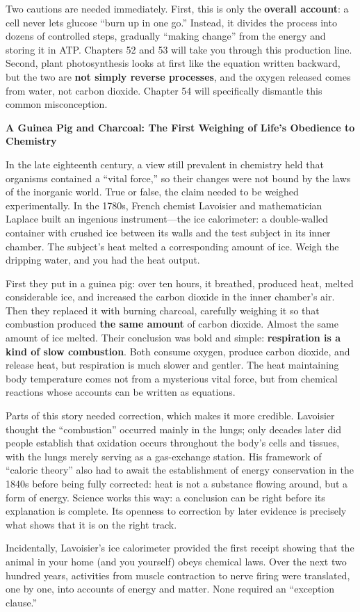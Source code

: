Two cautions are needed immediately. First, this is only the \textbf{overall account}: a cell never lets glucose ``burn up in one go.'' Instead, it divides the process into dozens of controlled steps, gradually ``making change'' from the energy and storing it in ATP. Chapters 52 and 53 will take you through this production line. Second, plant photosynthesis looks at first like the equation written backward, but the two are \textbf{not simply reverse processes}, and the oxygen released comes from water, not carbon dioxide. Chapter 54 will specifically dismantle this common misconception.

\begin{zhengju}
\textbf{A Guinea Pig and Charcoal: The First Weighing of Life's Obedience to Chemistry}

In the late eighteenth century, a view still prevalent in chemistry held that organisms contained a ``vital force,'' so their changes were not bound by the laws of the inorganic world. True or false, the claim needed to be weighed experimentally. In the 1780s, French chemist Lavoisier and mathematician Laplace built an ingenious instrument---the ice calorimeter: a double-walled container with crushed ice between its walls and the test subject in its inner chamber. The subject's heat melted a corresponding amount of ice. Weigh the dripping water, and you had the heat output.

First they put in a guinea pig: over ten hours, it breathed, produced heat, melted considerable ice, and increased the carbon dioxide in the inner chamber's air. Then they replaced it with burning charcoal, carefully weighing it so that combustion produced \textbf{the same amount} of carbon dioxide. Almost the same amount of ice melted. Their conclusion was bold and simple: \textbf{respiration is a kind of slow combustion}. Both consume oxygen, produce carbon dioxide, and release heat, but respiration is much slower and gentler. The heat maintaining body temperature comes not from a mysterious vital force, but from chemical reactions whose accounts can be written as equations.

Parts of this story needed correction, which makes it more credible. Lavoisier thought the ``combustion'' occurred mainly in the lungs; only decades later did people establish that oxidation occurs throughout the body's cells and tissues, with the lungs merely serving as a gas-exchange station. His framework of ``caloric theory'' also had to await the establishment of energy conservation in the 1840s before being fully corrected: heat is not a substance flowing around, but a form of energy. Science works this way: a conclusion can be right before its explanation is complete. Its openness to correction by later evidence is precisely what shows that it is on the right track.

Incidentally, Lavoisier's ice calorimeter provided the first receipt showing that the animal in your home (and you yourself) obeys chemical laws. Over the next two hundred years, activities from muscle contraction to nerve firing were translated, one by one, into accounts of energy and matter. None required an ``exception clause.''
\end{zhengju}

